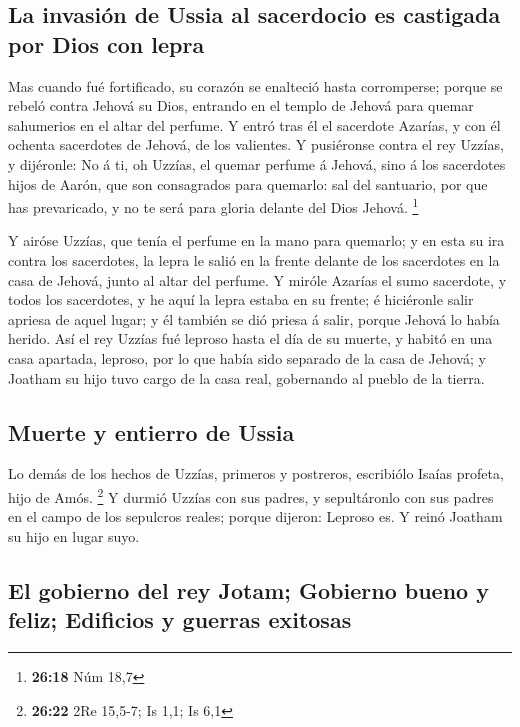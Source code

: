 \hypertarget{la-invasiuxf3n-de-ussia-al-sacerdocio-es-castigada-por-dios-con-lepra}{%
\subsection{La invasión de Ussia al sacerdocio es castigada por Dios con
lepra}\label{la-invasiuxf3n-de-ussia-al-sacerdocio-es-castigada-por-dios-con-lepra}}

 Mas cuando fué fortificado, su corazón se enalteció
hasta corromperse; porque se rebeló contra Jehová su Dios, entrando en
el templo de Jehová para quemar sahumerios en el altar del perfume.
 Y entró tras él el sacerdote Azarías, y con él ochenta
sacerdotes de Jehová, de los valientes.  Y pusiéronse
contra el rey Uzzías, y dijéronle: No á ti, oh Uzzías, el quemar perfume
á Jehová, sino á los sacerdotes hijos de Aarón, que son consagrados para
quemarlo: sal del santuario, por que has prevaricado, y no te será para
gloria delante del Dios Jehová. \footnote{\textbf{26:18} Núm 18,7}

 Y airóse Uzzías, que tenía el perfume en la mano para
quemarlo; y en esta su ira contra los sacerdotes, la lepra le salió en
la frente delante de los sacerdotes en la casa de Jehová, junto al altar
del perfume.  Y miróle Azarías el sumo sacerdote, y todos
los sacerdotes, y he aquí la lepra estaba en su frente; é hiciéronle
salir apriesa de aquel lugar; y él también se dió priesa á salir, porque
Jehová lo había herido.  Así el rey Uzzías fué leproso
hasta el día de su muerte, y habitó en una casa apartada, leproso, por
lo que había sido separado de la casa de Jehová; y Joatham su hijo tuvo
cargo de la casa real, gobernando al pueblo de la tierra.

\hypertarget{muerte-y-entierro-de-ussia}{%
\subsection{Muerte y entierro de
Ussia}\label{muerte-y-entierro-de-ussia}}

 Lo demás de los hechos de Uzzías, primeros y postreros,
escribiólo Isaías profeta, hijo de Amós. \footnote{\textbf{26:22} 2Re
  15,5-7; Is 1,1; Is 6,1}  Y durmió Uzzías con sus
padres, y sepultáronlo con sus padres en el campo de los sepulcros
reales; porque dijeron: Leproso es. Y reinó Joatham su hijo en lugar
suyo.

\hypertarget{el-gobierno-del-rey-jotam-gobierno-bueno-y-feliz-edificios-y-guerras-exitosas}{%
\subsection{El gobierno del rey Jotam; Gobierno bueno y feliz; Edificios
y guerras
exitosas}\label{el-gobierno-del-rey-jotam-gobierno-bueno-y-feliz-edificios-y-guerras-exitosas}}

